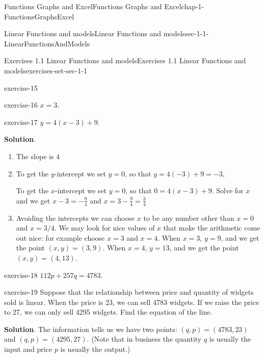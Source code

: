 \documentclass[oneside,10pt,]{book}
\numberwithin{equation}{section}
\begin{document}
\begin{chapterptx}{Functions Graphs and Excel}{}{Functions Graphs and Excel}{}{}{chap-1-FunctionsGraphsExcel}
\begin{sectionptx}{Linear Functions and models}{}{Linear Functions and models}{}{}{sec-1-1-LinearFunctionsAndModels}
\begin{exercises-subsection-numberless}{Exercises 1.1 Linear Functions and models}{}{Exercises 1.1 Linear Functions and models}{}{}{exercises-set-sec-1-1}
\begin{exercisegroup}
\begin{divisionexerciseeg}{15}{}{}{exercise-15}
\end{divisionexerciseeg}%
\begin{divisionexerciseeg}{16}{}{}{exercise-16}%
\hypertarget{p-123}{}%
\(x=3\).%
\end{divisionexerciseeg}%
\begin{divisionexerciseeg}{17}{}{}{exercise-17}%
\hypertarget{p-124}{}%
\(y=4(x-3)+9\).%
\par\smallskip%
\noindent\textbf{Solution}.\hypertarget{solution-9}{}\quad%
\leavevmode%
\begin{enumerate}[label=(\alph*)]
\item\hypertarget{li-57}{}\hypertarget{p-125}{}%
The slope is \(4\)%
\item\hypertarget{li-58}{}\hypertarget{p-126}{}%
To get the \(y\)-intercept we set \(y=0\), so that \(y=4(-3)+9=-3\),%
\par
\hypertarget{p-127}{}%
To get the \(x\)-intercept we set \(y=0\), so that \(0=4(x-3)+9\).  Solve for \(x\) and we get \(x-3=-\frac{9}{4}\) and \(x=3-\frac{9}{4}=\frac{3}{4}\)%
\item\hypertarget{li-59}{}\hypertarget{p-128}{}%
Avoiding the intercepts we can choose \(x\) to be any number other than \(x = 0\) and \(x=3/4\).  We may look for nice values of \(x\) that make the arithmetic come out nice: for example choose \(x=3\) and \(x=4\). When \(x=3\), \(y=9\), and we get the point \((x,y)=(3,9)\). When \(x=4\), \(y=13\), and we get the point \((x,y)=(4,13)\).%
\end{enumerate}
\end{divisionexerciseeg}%
\begin{divisionexerciseeg}{18}{}{}{exercise-18}%
\hypertarget{p-129}{}%
\(112 p+257 q=4783\).%
\end{divisionexerciseeg}%
\end{exercisegroup}
\par\medskip\noindent
\begin{divisionexercise}{19}{}{}{exercise-19}%
\hypertarget{p-130}{}%
Suppose that the relationship between price and quantity of widgets sold is linear.  When the price is \textdollar{}23, we can sell 4783 widgets.  If we raise the price to \textdollar{}27, we can only sell 4295 widgets.  Find the equation of the line.%
\par\smallskip%
\noindent\textbf{Solution}.\hypertarget{solution-10}{}\quad%
\hypertarget{p-131}{}%
The information tells us we have two points: \((q,p)=(4783,23)\)  and \((q,p)=(4295,27)\). (Note that in business the quantity \(q\) is usually the input and price \(p\) is usually the output.)%

\end{divisionexercise}
\end{exercises-subsection-numberless}
\end{sectionptx}
\end{chapterptx}
\end{document}
